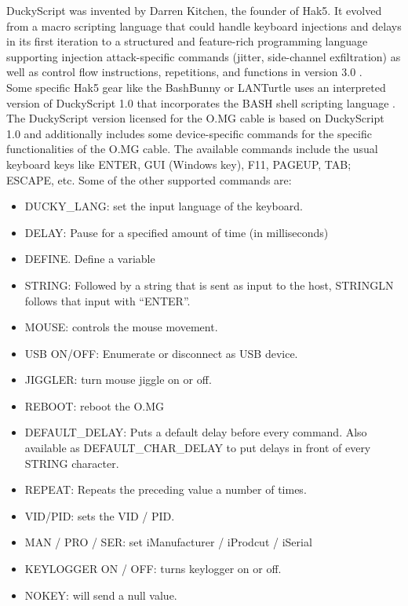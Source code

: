DuckyScript was invented by Darren Kitchen, the founder of Hak5. It evolved from a macro scripting language that could handle keyboard injections and delays in its first iteration to a structured and feature-rich programming language supporting injection attack-specific commands (jitter, side-channel exfiltration) as well as control flow instructions, repetitions, and functions in version 3.0 \cite{kitchenUSBRUBBERDUCKY2022}. \\
Some specific Hak5 gear like the BashBunny or LANTurtle uses an interpreted version of DuckyScript 1.0 that incorporates the BASH shell scripting language \cite{Hak5Usbrubberduckypayloads2024}. The DuckyScript version licensed for the O.MG cable is based on DuckyScript 1.0 and additionally includes some device-specific commands for the specific functionalities of the O.MG cable. The available commands include the usual keyboard keys like ENTER, GUI (Windows key), F11, PAGEUP, TAB; ESCAPE, etc. Some of the other supported commands are\cite{DuckyScriptSyntaxGuide}:
\begin{itemize}
    \item DUCKY\_LANG: set the input language of the keyboard.
    \item DELAY: Pause for a specified amount of time (in milliseconds)
    \item DEFINE. Define a variable
    \item STRING: Followed by a string that is sent as input to the host, STRINGLN follows that input with ``ENTER''.
    \item MOUSE: controls the mouse movement.
    \item USB ON/OFF: Enumerate or disconnect as USB device.
    \item JIGGLER: turn mouse jiggle on or off.
    \item REBOOT: reboot the O.MG
    \item DEFAULT\_DELAY: Puts a default delay before every command. Also available as DEFAULT\_CHAR\_DELAY to put delays in front of every STRING character.  
    \item REPEAT: Repeats the preceding value a number of times.
    \item VID/PID: sets the VID / PID.
    \item MAN / PRO / SER: set iManufacturer / iProdcut / iSerial
    \item KEYLOGGER ON / OFF: turns keylogger on or off.
    \item NOKEY: will send a null value.  
\end{itemize}

